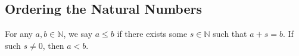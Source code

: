 \subsection{Ordering the Natural Numbers}


For any \( a, b \in \mathbb{N} \), we say \( a \leq b \) if there exists some \( s \in \mathbb{N} \) such that \( a + s = b \). If such \( s \neq 0 \), then \( a < b \).
\newpage